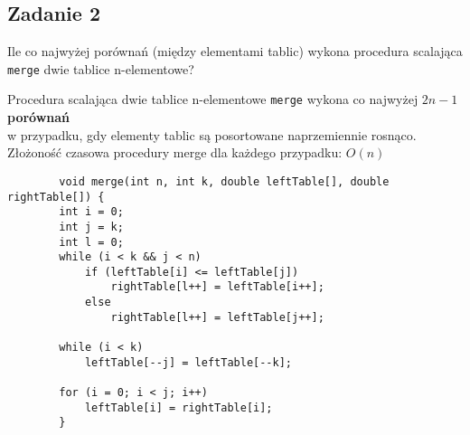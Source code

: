 \documentclass{article}
\begin{document}
    \subsection*{Zadanie 2}
    Ile co najwyżej porównań (między elementami tablic) wykona procedura scalająca \verb+merge+ dwie tablice n-elementowe?
    \begin{center}
        Procedura scalająca dwie tablice n-elementowe \verb+merge+ wykona co najwyżej $2n - 1$ \textbf{porównań} \\ 
        w przypadku, gdy elementy tablic są posortowane naprzemiennie rosnąco. \\
        Złożoność czasowa procedury merge dla każdego przypadku: $O(n)$
        \begin{lstlisting}
        void merge(int n, int k, double leftTable[], double rightTable[]) {
        int i = 0; 
        int j = k; 
        int l = 0; 
        while (i < k && j < n) 
            if (leftTable[i] <= leftTable[j]) 
                rightTable[l++] = leftTable[i++];
            else
                rightTable[l++] = leftTable[j++];

        while (i < k)
            leftTable[--j] = leftTable[--k];

        for (i = 0; i < j; i++)
            leftTable[i] = rightTable[i];
        }
        \end{lstlisting}
    \end{center}
        
\end{document}
